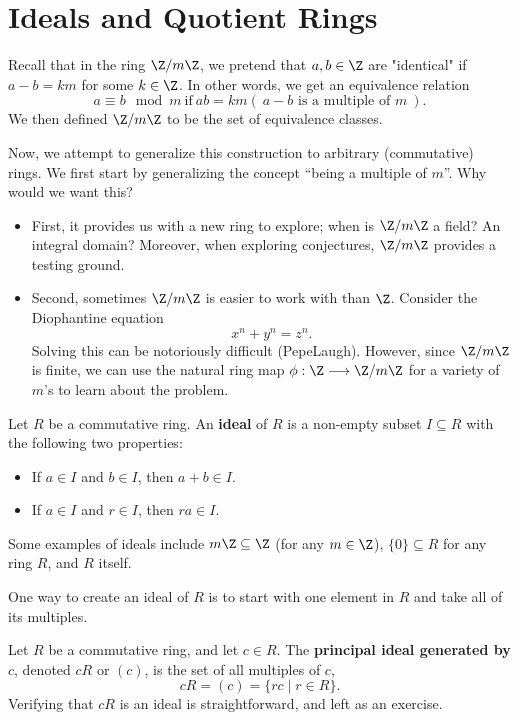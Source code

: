 \documentclass[math1530-lecture-notes]{subfiles}
\begin{document}
\section{Ideals and Quotient Rings}
Recall that in the ring $\Z / m\Z$, we pretend that $a,b\in \Z$ are "identical" if $a-b=km$ for some
$k\in \Z$. In other words, we get an equivalence relation \[
  a\equiv b\mod{m} ~\text{if}~ ab=km (~\text{$a-b$ is a multiple of $m$}~)
.\] We then defined $\Z / m\Z$ to be the set of equivalence classes.

Now, we attempt to generalize this construction to arbitrary (commutative) rings. We first start by
generalizing the concept ``being a multiple of $m$''. Why would we want this? 
\begin{itemize}
  \item First, it provides us with a new ring to explore; when is $\Z / m\Z$ a field? An integral
    domain? Moreover, when exploring conjectures, $\Z /m\Z$ provides a testing ground.
  \item Second, sometimes $\Z / m\Z$ is easier to work with than $\Z$. Consider the Diophantine
    equation \[
      x^{n}+y^{n}=z^{n}
    .\] Solving this can be notoriously difficult (PepeLaugh). However, since $\Z / m\Z$ is finite,
    we can use the natural ring map $\phi:\Z \longrightarrow \Z/m\Z$ for a variety of $m$'s to learn
    about the problem.
\end{itemize}

\begin{definition}[Ideals]{}
  Let $R$ be a commutative ring. An \textbf{ideal} of $R$ is a non-empty subset $I\subseteq R$ with
  the following two properties:
  \begin{itemize}
    \item If $a \in I$ and $b\in I$, then $a+b\in I$.
    \item If $a \in I$ and $r\in I$, then $ra\in I$.
  \end{itemize}
\end{definition}

Some examples of ideals include $m\Z\subseteq \Z$ (for any $m\in \Z$), $\{ 0 \}\subseteq R$ for any
ring $R$, and $R$ itself.

One way to create an ideal of $R$ is to start with one element in $R$ and take all of its multiples.
\begin{definition}{}
  Let $R$ be a commutative ring, and let $c\in R$. The \textbf{principal ideal generated by $c$},
  denoted $cR$ or $(c)$, is the set of all multiples of $c$, \[
    cR = (c) = \{rc\mid r\in R\} 
  .\] Verifying that $cR$ is an ideal is straightforward, and left as an exercise. 
\end{definition}
\end{document}
